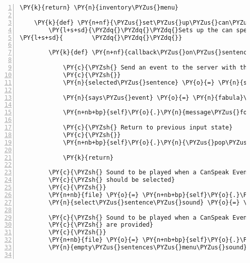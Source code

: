 \begin{Verbatim}[commandchars=\\\{\},numbers=left,firstnumber=1,stepnumber=1]
        \PY{k}{return} \PY{n}{inventory\PYZus{}menu}

    \PY{k}{def} \PY{n+nf}{\PYZus{}set\PYZus{}up\PYZus{}can\PYZus{}speak\PYZus{}menu}\PY{p}{(}\PY{n+nb+bp}{self}\PY{p}{)}\PY{p}{:}
        \PY{l+s+sd}{\PYZdq{}\PYZdq{}\PYZdq{}Sets up the can speak menu list.}
\PY{l+s+sd}{        \PYZdq{}\PYZdq{}\PYZdq{}}

        \PY{k}{def} \PY{n+nf}{callback\PYZus{}on\PYZus{}sentence\PYZus{}selected}\PY{p}{(}\PY{n}{select\PYZus{}sentence\PYZus{}menu}\PY{p}{)}\PY{p}{:}

            \PY{c}{\PYZsh{} Send an event to the server with the selected sentence}
            \PY{c}{\PYZsh{}}
            \PY{n}{selected\PYZus{}sentence} \PY{o}{=} \PY{n}{select\PYZus{}sentence\PYZus{}menu}\PY{o}{.}\PY{n}{list}\PY{p}{[}\PY{n}{select\PYZus{}sentence\PYZus{}menu}\PY{o}{.}\PY{n}{list\PYZus{}index}\PY{p}{]}

            \PY{n}{says\PYZus{}event} \PY{o}{=} \PY{n}{fabula}\PY{o}{.}\PY{n}{SaysEvent}\PY{p}{(}\PY{n+nb+bp}{self}\PY{o}{.}\PY{n}{host}\PY{o}{.}\PY{n}{client\PYZus{}id}\PY{p}{,} \PY{n}{selected\PYZus{}sentence}\PY{p}{)}

            \PY{n+nb+bp}{self}\PY{o}{.}\PY{n}{message\PYZus{}for\PYZus{}host}\PY{o}{.}\PY{n}{event\PYZus{}list}\PY{o}{.}\PY{n}{append}\PY{p}{(}\PY{n}{says\PYZus{}event}\PY{p}{)}

            \PY{c}{\PYZsh{} Return to previous input state}
            \PY{c}{\PYZsh{}}
            \PY{n+nb+bp}{self}\PY{o}{.}\PY{n}{\PYZus{}pop\PYZus{}input\PYZus{}state\PYZus{}from\PYZus{}stack}\PY{p}{(}\PY{p}{)}

            \PY{k}{return}

        \PY{c}{\PYZsh{} Sound to be played when a CanSpeak Event is processed and a sentence}
        \PY{c}{\PYZsh{} should be selected}
        \PY{c}{\PYZsh{}}
        \PY{n+nb}{file} \PY{o}{=} \PY{n+nb+bp}{self}\PY{o}{.}\PY{n}{assets}\PY{o}{.}\PY{n}{fetch}\PY{p}{(}\PY{l+s}{\PYZsq{}}\PY{l+s}{select\PYZus{}sentence.ogg}\PY{l+s}{\PYZsq{}}\PY{p}{)}
        \PY{n}{select\PYZus{}sentence\PYZus{}sound} \PY{o}{=} \PY{n}{pygame}\PY{o}{.}\PY{n}{mixer}\PY{o}{.}\PY{n}{Sound}\PY{p}{(}\PY{n+nb}{file}\PY{p}{)}

        \PY{c}{\PYZsh{} Sound to be played when a CanSpeak Event is processed and no sentences}
        \PY{c}{\PYZsh{} are provided}
        \PY{c}{\PYZsh{}}
        \PY{n+nb}{file} \PY{o}{=} \PY{n+nb+bp}{self}\PY{o}{.}\PY{n}{assets}\PY{o}{.}\PY{n}{fetch}\PY{p}{(}\PY{l+s}{\PYZsq{}}\PY{l+s}{empty\PYZus{}sentences\PYZus{}menu.ogg}\PY{l+s}{\PYZsq{}}\PY{p}{)}
        \PY{n}{empty\PYZus{}sentences\PYZus{}menu\PYZus{}sound} \PY{o}{=} \PY{n}{pygame}\PY{o}{.}\PY{n}{mixer}\PY{o}{.}\PY{n}{Sound}\PY{p}{(}\PY{n+nb}{file}\PY{p}{)}


\end{Verbatim}
